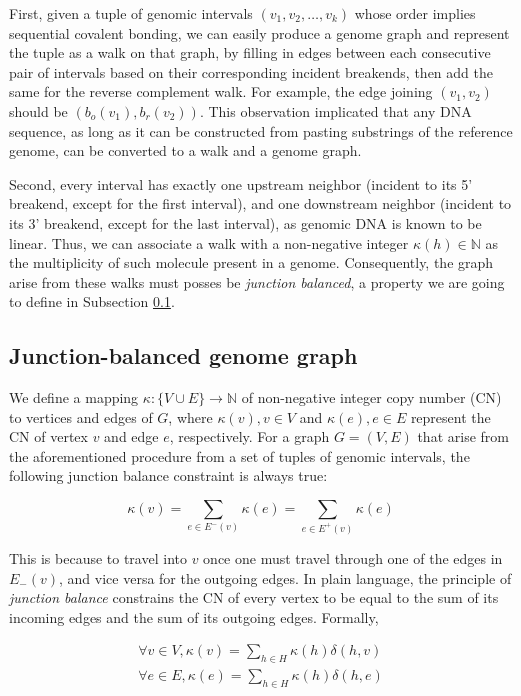 \documentclass[phd,tocprelim]{cornell}
\begin{document}
First, given a tuple of genomic intervals $(v_1, v_2, \dots, v_k)$ whose order implies sequential covalent bonding, we can easily produce a genome graph and represent the tuple as a walk on that graph, by filling in edges between each consecutive pair of intervals based on their corresponding incident breakends, then add the same for the reverse complement walk. For example, the edge joining $(v_1, v_2)$ should be $(b_o(v_1), b_r(v_2))$. This observation implicated that any DNA sequence, as long as it can be constructed from pasting substrings of the reference genome, can be converted to a walk and a genome graph.

Second, every interval has exactly one upstream neighbor (incident to its 5' breakend, except for the first interval), and one downstream neighbor (incident to its 3' breakend, except for the last interval), as genomic DNA is known to be linear. Thus, we can associate a walk with a non-negative integer $\kappa(h) \in \mathbb{N}$ as the multiplicity of such molecule present in a genome. Consequently, the graph arise from these walks must posses be \textit{junction balanced}, a property we are going to define in  Subsection \ref{sub:JBGG}.

\subsection{Junction-balanced genome graph} \label{sub:JBGG}
We define a mapping $\kappa:\{V \cup E\}\rightarrow \mathbb{N}$ of non-negative integer copy number (CN) to vertices and edges of $G$, where $\kappa(v),v \in V$ and  $\kappa(e),e \in E$ represent the CN of vertex $v$ and edge $e$, respectively. For a graph $G = (V, E)$ that arise from the aforementioned procedure from a set of tuples of genomic intervals, the following junction balance constraint is always true:

\begin{equation} \label{eq:junction_balance_constraint}
    \kappa(v)= \sum_{e\in E^-(v)} \kappa(e) = \sum_{e\in E^+(v)} \kappa(e)
\end{equation}

This is because to travel into $v$ once one must travel through one of the edges in $E_{-}(v)$, and vice versa for the outgoing edges. In plain language, the principle of \textit{junction balance} constrains the CN of every vertex to be equal to the sum of its incoming edges and the sum of its outgoing edges. Formally,

\begin{equation} \label{eq:sum_of_walk}
    \begin{split}
        \forall v \in V, \kappa(v) = \sum_{h \in H}\kappa(h)\delta(h, v) \\
        \forall e \in E, \kappa(e) = \sum_{h \in H}\kappa(h)\delta(h, e)
    \end{split}
\end{equation}
\end{document}
